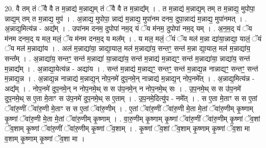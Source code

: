 \documentclass[17pt]{extarticle}
\begin{document}
20. वै तम् तं ॅवै वै त म॒न्नाद्य॑ म॒न्नाद्य॒म् तं ॅवै वै त म॒न्नाद्य᳚म् । . त म॒न्नाद्य॑ म॒न्नाद्य॒म् तम् त म॒न्नाद्य॒ मुपोपा॒ न्नाद्य॒म् तम् त म॒न्नाद्य॒ मुप॑ । . अ॒न्नाद्य॒ मुपोपा॒ न्नाद्य॑ म॒न्नाद्य॒ मुपा॑नम दनम॒ दुपा॒न्नाद्य॑ म॒न्नाद्य॒ मुपा॑नमत् । . अ॒न्नाद्य॒मित्य॑न्न - अद्य᳚म् । . उपा॑नम दनम॒ दुपोपा॑ नम॒द् यं ॅय म॑नम॒ दुपोपा॑ नम॒द् यम् । . अ॒न॒म॒द् यं ॅय म॑नम दनम॒द् य मल॒ मलं॒ ॅय म॑नम दनम॒द् य मल᳚म् । . य मल॒ मलं॒ ॅयं ॅय मल॑ म॒न्ना द्या॑या॒न्नाद्या॒ यालं॒ ॅयं ॅय मल॑ म॒न्नाद्या॑य । . अल॑ म॒न्नाद्या॑या॒ न्नाद्या॒याल॒ मल॑ म॒न्नाद्या॑य॒ सन्तꣳ॒॒ सन्त॑ म॒न्ना द्या॒याल॒ मल॑ म॒न्नाद्या॑य॒ सन्त᳚म् । . अ॒न्नाद्या॑य॒ सन्तꣳ॒॒ सन्त॑ म॒न्नाद्या॑ या॒न्नाद्या॑य॒ सन्त॑ म॒न्नाद्य॑ म॒न्नाद्यꣳ॒॒ सन्त॑ म॒न्नाद्या॑या॒ न्नाद्या॑य॒ सन्त॑ म॒न्नाद्य᳚म् । . अ॒न्नाद्या॒येत्य॑न्न - अद्या॑य । . सन्त॑ म॒न्नाद्य॑ म॒न्नाद्यꣳ॒॒ सन्तꣳ॒॒ सन्त॑ म॒न्नाद्य॒न्न नान्नाद्यꣳ॒॒ सन्तꣳ॒॒ सन्त॑ म॒न्नाद्य॒न्न । . अ॒न्नाद्य॒न्न नान्नाद्य॑ म॒न्नाद्य॒न् नोप॒नमे॑ दुप॒नमे॒न् नान्नाद्य॑ म॒न्नाद्य॒न् नोप॒नमे᳚त् । . अ॒न्नाद्य॒मित्य॑न्न - अद्य᳚म् । . नोप॒नमे॑ दुप॒नमे॒न् न नोप॒नमे॒थ् स स उ॑प॒नमे॒न् न नोप॒नमे॒थ् सः । . उ॒प॒नमे॒थ् स स उ॑प॒नमे॑ दुप॒नमे॒थ् स ए॒ता मे॒ताꣳ स उ॑प॒नमे॑ दुप॒नमे॒थ् स ए॒ताम् । . उ॒प॒नमे॒दित्यु॑प - नमे᳚त् । . स ए॒ता मे॒ताꣳ स स ए॒तां ॅवा॑रु॒णीं ॅवा॑रु॒णी मे॒ताꣳ स स ए॒तां ॅवा॑रु॒णीम् । . ए॒तां ॅवा॑रु॒णीं ॅवा॑रु॒णी मे॒ता मे॒तां ॅवा॑रु॒णीम् कृ॒ष्णाम् कृ॒ष्णां ॅवा॑रु॒णी मे॒ता मे॒तां ॅवा॑रु॒णीम् कृ॒ष्णाम् । . वा॒रु॒णीम् कृ॒ष्णाम् कृ॒ष्णां ॅवा॑रु॒णीं ॅवा॑रु॒णीम् कृ॒ष्णां ॅव॒शां ॅव॒शाम् कृ॒ष्णां ॅवा॑रु॒णीं ॅवा॑रु॒णीम् कृ॒ष्णां ॅव॒शाम् । . कृ॒ष्णां ॅव॒शां ॅव॒शाम् कृ॒ष्णाम् कृ॒ष्णां ॅव॒शा मा व॒शाम् कृ॒ष्णाम् कृ॒ष्णां ॅव॒शा मा । \newline
\end{document}
